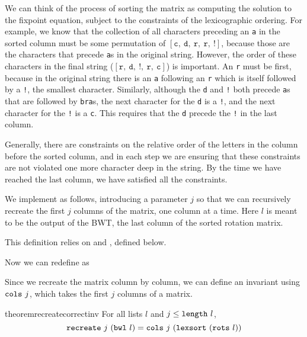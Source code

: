 \documentclass[sigplan,10pt,anonymous,review]{thesis}
\begin{document}
We can think of the process of sorting the matrix as computing the
solution to the fixpoint equation, subject to the constraints of the
lexicographic ordering. For example, we know that the collection of
all characters preceding an \texttt{a} in the sorted column must be
some permutation of
$[\texttt{c},~\texttt{d},~\texttt{r},~\texttt{r},~\texttt{!}]$,
because those are the characters that precede \texttt{a}s in the
original string. However, the order of these characters in the final
string
($[\texttt{r},~\texttt{d},~\texttt{!},~\texttt{r},~\texttt{c}]$) is
important. An \texttt{r} must be first, because in the original string
there is an \texttt{a} following an \texttt{r} which is itself
followed by a \texttt{!}, the smallest character. Similarly, although
the \texttt{d} and \texttt{!} both precede \texttt{a}s that are
followed by \texttt{bra}s, the next character for the \texttt{d} is a
\texttt{!}, and the next character for the \texttt{!} is a \texttt{c}.
This requires that the \texttt{d} precede the \texttt{!} in the last
column.

Generally, there are constraints on the relative order of the letters
in the column before the sorted column, and in each step we are
ensuring that these constraints are not violated one more character
deep in the string. By the time we have reached the last column, we
have satisfied all the constraints.

We implement  as follows, introducing a parameter $j$ so
that we can recursively recreate the first $j$ columns of the matrix,
one column at a time. Here $l$ is meant to be the output of the BWT,
the last column of the sorted rotation matrix.

This definition relies on  and , defined below.



Now we can redefine  as


Since we recreate the matrix column by column, we can define an
invariant using $\texttt{\textup{cols}}~j$, which takes the first $j$ columns of a matrix.


\begin{restatable*}{theorem}{recreatecorrectinv}
  For all lists $l$ and $j \le \texttt{\textup{length}}~l$,
  \begin{equation*}
    \texttt{\textup{recreate}}~j~(\texttt{\textup{bwl}}~l) =
    \texttt{\textup{cols}}~j~(\texttt{\textup{lexsort}}~(\texttt{\textup{rots}}~l))
  \end{equation*}
\end{restatable*}
\end{document}
